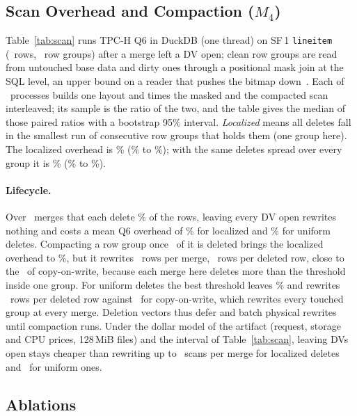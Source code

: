 \documentclass[sigconf, nonacm]{acmart}
\begin{document}
\subsection{Scan Overhead and Compaction ($M_4$)}
\label{sec:eval_read}



Table~\ref{tab:scan} runs TPC-H Q6 in DuckDB (one thread) on SF\,1 \texttt{lineitem} (\ScanRows\ rows, \ScanGroups\ row groups) after a merge left a DV open; clean row groups are read from untouched base data and dirty ones through a positional mask join at the SQL level, an upper bound on a reader that pushes the bitmap down~\cite{pedreira2022velox}. Each of \ScanProcesses\ processes builds one layout and times the masked and the compacted scan interleaved; its sample is the ratio of the two, and the table gives the median of those paired ratios with a bootstrap 95\% interval. \emph{Localized} means all deletes fall in the smallest run of consecutive row groups that holds them (one group here). The localized overhead is \ScanLocOver\% (\ScanLocLow\% to \ScanLocHigh\%)\ScanLocVerdict; with the same deletes spread over every group it is \ScanUniOver\% (\ScanUniLow\% to \ScanUniHigh\%).

\paragraph{Lifecycle.} Over \CompMerges\ merges that each delete \CompDeletePct\% of the rows, leaving every DV open rewrites nothing and costs a mean Q6 overhead of \CompLocNone\% for localized and \CompUniNone\% for uniform deletes. Compacting a row group once \CompLocThr\ of it is deleted brings the localized overhead to \CompLocBest\%, but it rewrites \CompLocRewrite\ rows per merge, \CompLocWaf\ rows per deleted row, close to the \CompCowLocWaf\ of copy-on-write, because each merge here deletes more than the threshold inside one group. For uniform deletes the best threshold leaves \CompUniBest\% and rewrites \CompUniWaf\ rows per deleted row against \CompCowUniWaf\ for copy-on-write, which rewrites every touched group at every merge. Deletion vectors thus defer and batch physical rewrites until compaction runs. Under the dollar model of the artifact (request, storage and CPU prices, 128\,MiB files) and the interval of Table~\ref{tab:scan}, leaving DVs open stays cheaper than rewriting up to \CrossLocRange\ scans per merge for localized deletes and \CrossUniRange\ for uniform ones.

\subsection{Ablations}
\label{sec:eval_ablation}
\end{document}
